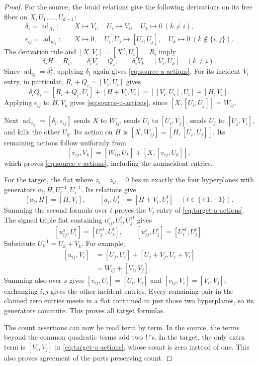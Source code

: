 \documentclass[11pt]{article}
\DeclareMathOperator{\ad}{ad}
\theoremstyle{definition}
\theoremstyle{remark}
\numberwithin{equation}{section}
\begin{document}
\begin{proof}
For the source, the braid relations give the following derivations
on its free fiber on $X,U_1,\ldots,U_{d-1}$:
\[
 \begin{aligned}
 \delta_i=\ad_{X_i}:&\quad
 X\longmapsto V_i,\quad U_i\longmapsto V_i,\quad
 U_k\longmapsto0\ (k\ne i),\\
 \epsilon_{ij}=\ad_{u_{ij}}:&\quad
 X\longmapsto0,\quad U_i,U_j\longmapsto[U_i,U_j],\quad
 U_k\longmapsto0\ (k\notin\{i,j\}).
 \end{aligned}
\]
The derivation rule and $[X,V_i]=[X^2,U_i]=R_i$ imply
\[
 \delta_iH=R_i,\qquad \delta_iV_i=Q_i,\qquad
 \delta_iV_k=[V_i,U_k]\quad(k\ne i).
\]
Since $\ad_{a_i}=\delta_i^2$, applying $\delta_i$ again gives
\eqref{eq:source-a-actions}.  For its incident $V_i$ entry, in
particular, $R_i+Q_i=[V_i,U_i]$ gives
\[
 \delta_iQ_i=[R_i+Q_i,U_i]+[H+V_i,V_i]
 =[ [V_i,U_i],U_i]+[H,V_i].
\]
Applying $\epsilon_{ij}$ to $H,V_k$ gives
\eqref{eq:source-u-actions}, since
$[X,[U_i,U_j]]=W_{ij}$.

Next $\ad_{v_{ij}}=[\delta_i,\epsilon_{ij}]$ sends $X$ to $W_{ij}$,
sends $U_i$ to $[U_i,V_j]$, sends $U_j$ to $[U_j,V_i]$, and kills the
other $U_k$.  Its action on $H$ is
$[X,W_{ij}]=[H,[U_i,U_j]]$.  Its remaining actions follow uniformly
from
\[
 [v_{ij},V_k]=[W_{ij},U_k]+[X,[v_{ij},U_k]],
\]
which proves \eqref{eq:source-v-actions}, including the nonincident
entries.

For the target, the flat where $z_i=z_d=0$ lies in exactly the four
hyperplanes with generators $a_i,H,U_i^{+1},U_i^{-1}$.  Its relations give
\[
 [a_i,H]=[H,V_i],\qquad
 [a_i,U_i^t]=[H+V_i,U_i^t]\quad(t\in\{+1,-1\}).
\]
Summing the second formula over $t$ proves the $V_i$ entry of
\eqref{eq:target-a-actions}.  The signed triple flat containing
$u_{ij}^s,U_i^t,U_j^{st}$ gives
\[
 [u_{ij}^s,U_i^t]=[U_j^{st},U_i^t],\qquad
 [u_{ij}^s,U_j^t]=[U_i^{st},U_j^t].
\]
Substitute $U_k^{-1}=U_k+V_k$.  For example,
\[
 \begin{aligned}
 [u_{ij},V_i]
 &=[U_j,U_i]+[U_j+V_j,U_i+V_i]\\
 &=W_{ij}+[V_i,V_j].
 \end{aligned}
\]
Summing also over $s$ gives
$[v_{ij},U_i]=[U_i,V_j]$ and
$[v_{ij},V_i]=[V_i,V_j]$; exchanging $i,j$ gives the other incident
entries.  Every remaining pair in the claimed zero entries meets
in a flat contained in just those two hyperplanes, so its generators
commute.  This proves all target formulas.

The count assertions can now be read term by term.  In the source,
the terms beyond the common quadratic terms add two $U$'s.  In the
target, the only extra term is $[V_i,V_j]$ in
\eqref{eq:target-u-actions}, whose count is zero instead of one.
This also proves agreement of the parts preserving count.
\end{proof}
\end{document}
